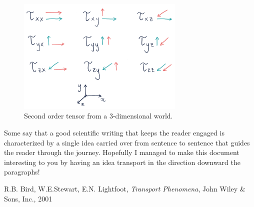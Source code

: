 \documentclass[10pt,twocolumn]{article}
\begin{document}
\newpage

\begin{figure}[H]
\centering\includegraphics[width=8cm]{tensor-in-matrix-form.png}
\caption{Second order tensor from a 3-dimensional world.}
\label{fig:tensor-in-matrix-form}
\end{figure}











Some say that a good scientific writing that keeps the reader engaged is characterized by a single idea carried over from sentence to sentence that guides the reader through the journey. Hopefully I managed to make this document interesting to you by having an idea transport in the direction downward the paragraphs!


















\thebibliography{}

 R.B. Bird, W.E.Stewart, E.N. Lightfoot, \textit{Transport Phenomena}, John Wiley \& Sons, Inc., 2001
\end{document}
